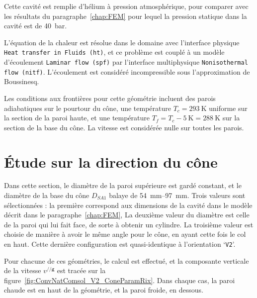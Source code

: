 Cette cavité est remplie d'hélium à pression atmosphérique, pour comparer avec les résultats du paragraphe~\ref{chap:FEM} pour lequel la pression statique dans la cavité est de \qty{40}{\bar}.\medskip

L'équation de la chaleur est résolue dans le domaine avec l'interface physique \texttt{Heat transfer in Fluids (ht)}, et ce problème est couplé à un modèle d'écoulement \texttt{Laminar flow  (spf)} par l'interface multiphysique \texttt{Nonisothermal flow (nitf)}. L'écoulement est considéré incompressible sous l'approximation de Boussinesq.\smallskip

Les conditions aux frontières pour cette géométrie incluent des parois adiabatiques sur le pourtour du cône, une température $T_c=\qty{293}{\kelvin}$ uniforme sur la section de la paroi haute, et une température $T_f=T_c-\qty{5}{\kelvin}=\qty{288}{\kelvin}$ sur la section de la base du cône. La vitesse est considérée nulle sur toutes les parois.

\section{\'Etude sur la direction du cône}
Dans cette section, le diamètre de la paroi supérieure est gardé constant, et le diamètre de la base du cône $D_{SA1}$ balaye de \qtyrange{54}{97}{\milli\meter}. Trois valeurs sont sélectionnées : la première correspond aux dimensions de la cavité dans le modèle décrit dans le paragraphe~\ref{chap:FEM}, La deuxième valeur du diamètre est celle de la paroi qui lui fait face, de sorte à obtenir un cylindre. La troisième valeur est choisie de manière à avoir le même angle pour le cône, en ayant cette fois le col en haut. Cette dernière configuration est quasi-identique à l'orientation `\texttt{V2}'.\smallskip

Pour chacune de ces géométries, le calcul est effectué, et la composante verticale de la vitesse $v^{//\mathbf g}$ est tracée sur la figure~\ref{fig:ConvNatComsol_V2_ConeParamRix}. Dans chaque cas, la paroi chaude est en haut de la géométrie, et la paroi froide, en dessous. 

